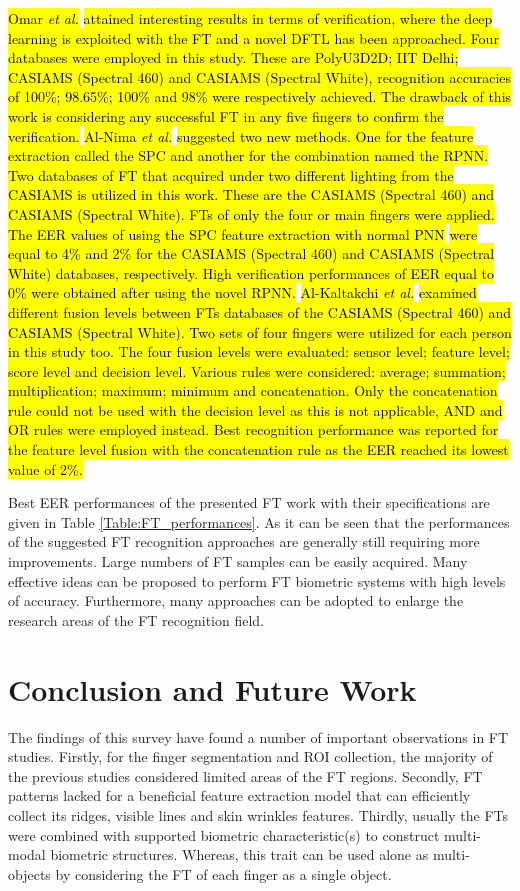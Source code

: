 \documentclass[review]{elsarticle}
\begin{document}
	\hl{Omar \textit{et al.}} \cite{omar2018deep} \hl{attained interesting results in terms of verification, where the deep learning is exploited with the FT and a novel DFTL has been approached. Four databases were employed in this study. These are PolyU3D2D; IIT Delhi; CASIAMS (Spectral 460) and CASIAMS (Spectral White), recognition accuracies of 100\%; 98.65\%; 100\% and 98\% were respectively achieved. The drawback of this work is considering any successful FT in any five fingers to confirm the verification.} \hl{Al-Nima \textit{et al.}} \cite{al2018personal} \hl{suggested two new methods. One for the feature extraction called the SPC and another for the combination named the RPNN. Two databases of FT that acquired under two different lighting from the CASIAMS is utilized in this work. These are the CASIAMS (Spectral 460) and CASIAMS (Spectral White). FTs of only the four or main fingers were applied. The EER values of using the SPC feature extraction with normal PNN} \cite{PNN_MatlabCode} \hl{were equal to 4\% and 2\% for the CASIAMS (Spectral 460) and CASIAMS (Spectral White) databases, respectively. High verification performances of EER equal to 0\% were obtained after using the novel RPNN.} \hl{Al-Kaltakchi \textit{et al.}} \cite{al2018finger} \hl{examined different fusion levels between FTs databases of the CASIAMS (Spectral 460) and CASIAMS (Spectral White). Two sets of four fingers were utilized for each person in this study too. The four	fusion levels were evaluated: sensor level; feature level; score level and decision level. Various rules were considered: average; summation; multiplication;	maximum; minimum and concatenation. Only the concatenation rule could not be used with the decision level as this is not applicable, AND and OR rules were employed instead. Best recognition performance was reported for the	feature level fusion with the concatenation rule as the EER reached its lowest value of 2\%.}

	Best EER performances of the presented FT work with their specifications are given in Table \ref{Table:FT_performances}. As it can be seen that the performances of the suggested FT recognition approaches are generally still requiring more improvements. Large numbers of FT samples can be easily acquired. Many effective ideas can be proposed to perform FT biometric systems with high levels of accuracy. Furthermore, many approaches can be adopted to enlarge the research areas of the FT recognition field. 

\section{Conclusion and Future Work}
	The findings of this survey have found a number of important observations in FT studies. Firstly, for the finger segmentation and ROI collection, the majority of the previous studies considered limited areas of the FT regions. Secondly, FT patterns lacked for a beneficial feature extraction model that can efficiently collect its ridges, visible lines and skin wrinkles features. Thirdly, usually the FTs were combined with supported biometric characteristic(s) to construct multi-modal biometric structures. Whereas, this trait can be used alone as multi-objects by considering the FT of each finger as a single object. 
	
\end{document}
